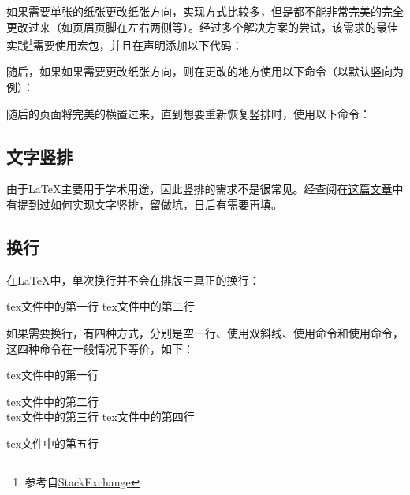     如果需要单张的纸张更改纸张方向，实现方式比较多，但是都不能非常完美的完全更改过来（如页眉页脚在左右两侧等）。经过多个解决方案的尝试，该需求的最佳实践\footnote{参考自\href{https://tex.stackexchange.com/a/374533/193826}{StackExchange}}需要使用宏包，并且在声明添加以下代码：
    \begin{texcode}
        \makeatletter
        \def\ifGm@preamble#1{\@firstofone}
        \appto\restoregeometry{%
        \pdfpagewidth=\paperwidth
        \pdfpageheight=\paperheight}
        \apptocmd\newgeometry{%
        \pdfpagewidth=\paperwidth
        \pdfpageheight=\paperheight}{}{}
        \makeatother
    \end{texcode}
    随后，如果如果需要更改纸张方向，则在更改的地方使用以下命令（以默认竖向为例）：
    \begin{texcode}
    \end{texcode}
    随后的页面将完美的横置过来，直到想要重新恢复竖排时，使用以下命令：
    \begin{texcode}
        \restoregeometry
    \end{texcode}

        

    \subsection{文字竖排}
    由于\LaTeX{}主要用于学术用途，因此竖排的需求不是很常见。经查阅在\href{https://www.latexstudio.net/archives/536.html}{这篇文章}中有提到过如何实现文字竖排，留做坑，日后有需要再填。

    \subsection{换行}
    在\LaTeX{}中，单次换行并不会在排版中真正的换行：
    \begin{texshow}
        tex文件中的第一行
        tex文件中的第二行
    \end{texshow}

    如果需要换行，有四种方式，分别是空一行、使用双斜线、使用命令和使用命令，这四种命令在一般情况下等价，如下：
    \begin{texshow}
        tex文件中的第一行

        tex文件中的第二行\\
        tex文件中的第三行\newline
        tex文件中的第四行\par
        tex文件中的第五行
    \end{texshow}
    
